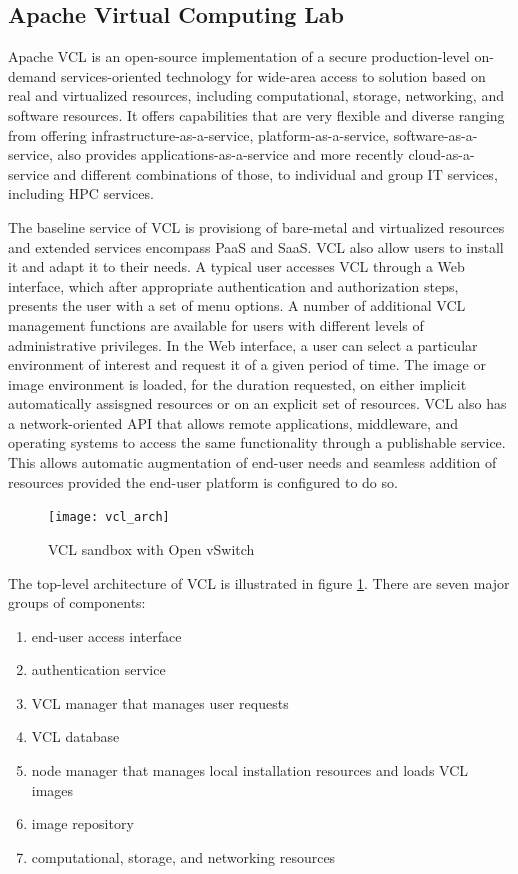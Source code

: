 \documentclass[12pt]{extarticle}
\begin{document}
\subsection{Apache Virtual Computing Lab} \label{apachevcl}
Apache VCL is an open-source implementation of a secure production-level on-demand services-oriented technology for wide-area access to solution based on real and virtualized resources, including computational, storage, networking, and software resources. It offers capabilities that are very flexible and diverse ranging from offering infrastructure-as-a-service, platform-as-a-service, software-as-a-service, also provides applications-as-a-service and more recently cloud-as-a-service and different combinations of those, to individual and group IT services, including HPC services.

The baseline service of VCL is provisiong of bare-metal and virtualized resources and extended services encompass PaaS and SaaS. VCL also allow users to install it and adapt it to their needs. A typical user accesses VCL through a Web interface, which after appropriate authentication and authorization steps, presents the user with a set of menu options. A number of additional VCL management functions are available for users with different levels of administrative privileges. In the Web interface, a user can select a particular environment of interest and request it of a given period of time. The image or image environment is loaded, for the duration requested, on either implicit automatically assisgned resources or on an explicit set of resources. VCL also has a network-oriented API that allows remote applications, middleware, and operating systems to access the same functionality through a publishable service. This allows automatic augmentation of end-user needs and seamless addition of resources provided the end-user platform is configured to do so.

\begin{figure}[H]
\centering
\texttt{[image: vcl\_arch]}
\caption{VCL sandbox with Open vSwitch}
\label{fig:vclarch}
\end{figure}

The top-level architecture of VCL is illustrated in figure \ref{fig:vclarch}. There are seven major groups of components:
\begin{enumerate}
    \item end-user access interface
    \item authentication service
    \item VCL manager that manages user requests
    \item VCL database
    \item node manager that manages local installation resources and loads VCL images
    \item image repository
    \item computational, storage, and networking resources
\end{enumerate}
\end{document}
